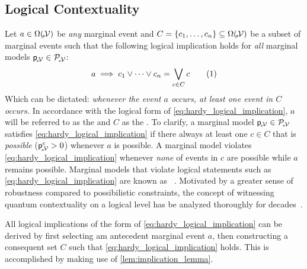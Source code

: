 \documentclass[aps, 10pt, english, twoside, twocolumn, pra, nofootinbib, tightenlines, longbibliography, superscriptaddress]{revtex4-1}
\begin{document}
    \subsection{Logical Contextuality}
    \label{sec:logical_contextuality}
    Let $a \in \events{\mscenariowrap}$ be \textit{any} marginal event and $C = \bc{c_1, \ldots, c_n} \subseteq \events{\mscenariowrap}$ be a subset of marginal events such that the following logical implication holds for \textit{all} marginal models ${\mathsf{p}}_{\!{}_*\!\mathcal{V}} \in \mathcal{P}_{\!{}_*\!\mathcal{V}}$:
    \[ a \implies c_1 \vee \cdots \vee c_n = \bigvee_{c \in C} c \eq \label{eq:hardy_logical_implication} \]
    Which can be dictated: \textit{whenever the event $a$ occurs, at least one event in $C$ occurs.} In accordance with the logical form of \cref{eq:hardy_logical_implication}, $a$ will be referred to as the  and $C$ as the . To clarify, a marginal model ${\mathsf{p}}_{\!{}_*\!\mathcal{V}} \in \mathcal{P}_{\!{}_*\!\mathcal{V}}$ satisfies \cref{eq:hardy_logical_implication} if there always at least one $c \in C$ that is \textit{possible} (${\mathsf{p}}_{\!{}_*\!\mathcal{V}}^{c} > 0$) whenever $a$ is possible. A marginal model violates \cref{eq:hardy_logical_implication} whenever \textit{none} of events in $c$ are possible while $a$ remains possible. Marginal models that violate logical statements such as \cref{eq:hardy_logical_implication} are known as ~\cite{Inflation,Mansfield_2012,Mancinska_2014}. Motivated by a greater sense of robustness compared to possibilistic constraints, the concept of witnessing quantum contextuality on a logical level has be analyzed thoroughly for decades~\cite{Abramsky_2012,Greenberger_1990}.

    All logical implications of the form of \cref{eq:hardy_logical_implication} can be derived by first selecting am antecedent marginal event $a$, then constructing a consequent set $C$ such that \cref{eq:hardy_logical_implication} holds. This is accomplished by making use of \cref{lem:implication_lemma}.
\end{document}
